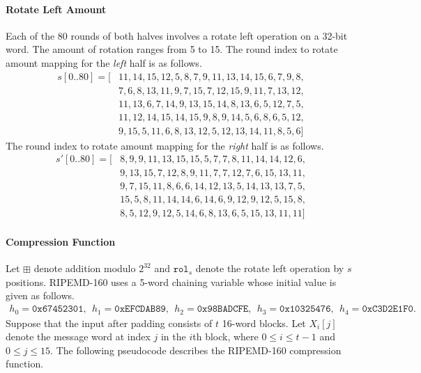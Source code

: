 \documentclass[10pt]{article}
\begin{document}
\paragraph{Rotate Left Amount}
Each of the 80 rounds of both halves involves a rotate left operation on a 32-bit word. The amount of rotation ranges from 5 to 15.
The round index to rotate amount mapping for the \textit{left} half is as follows.
\begin{align*}
  s[0..80]  =
  [&11, 14, 15, 12,  5,  8,  7,  9, 11, 13, 14, 15,  6,  7,  9,  8,\\
   &7,  6,  8, 13, 11,  9,  7, 15,  7, 12, 15,  9, 11,  7, 13, 12,\\
   &11, 13,  6,  7, 14,  9, 13, 15, 14,  8, 13,  6,  5, 12,  7,  5,\\
   &11, 12, 14, 15, 14, 15,  9,  8,  9, 14,  5,  6,  8,  6,  5, 12,\\
   &9, 15,  5, 11,  6,  8, 13, 12,  5, 12, 13, 14, 11,  8,  5,  6]
\end{align*}
The round index to rotate amount mapping for the \textit{right} half is as follows.
\begin{align*}
  s'[0..80]  =
  [&8,  9,  9, 11, 13, 15, 15,  5,  7,  7,  8, 11, 14, 14, 12,  6,\\
   &9, 13, 15,  7, 12,  8,  9, 11,  7,  7, 12,  7,  6, 15, 13, 11,\\
   &9,  7, 15, 11,  8,  6,  6, 14, 12, 13,  5, 14, 13, 13,  7,  5,\\
   &15,  5,  8, 11, 14, 14,  6, 14,  6,  9, 12,  9, 12,  5, 15,  8,\\
   &8,  5, 12,  9, 12,  5, 14,  6,  8, 13,  6,  5, 15, 13, 11, 11]
\end{align*}
\paragraph{Compression Function}
Let $\boxplus$ denote addition modulo $2^{32}$ and $\texttt{rol}_{s}$ denote the rotate left operation by $s$ positions. RIPEMD-160 uses a 5-word chaining variable whose initial value is given as follows.
\begin{align*}
  h_0 = \texttt{0x67452301},\ \  h_1 = \texttt{0xEFCDAB89},\ \  h_2 = \texttt{0x98BADCFE},\ \  h_3 = \texttt{0x10325476},\ \  h_4 = \texttt{0xC3D2E1F0}. 
\end{align*}
Suppose that the input after padding consists of $t$ 16-word blocks. Let $X_i[j]$ denote the message word at index $j$ in the $i$th block, where $0 \le i \le  t-1$ and $0 \le j \le  15$. The following pseudocode describes the RIPEMD-160 compression function.
\end{document}
